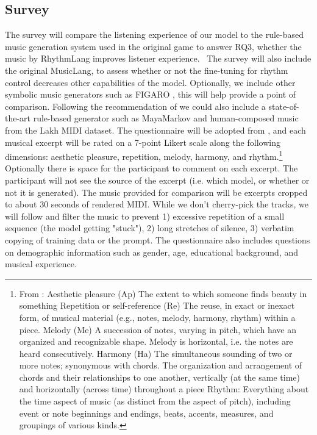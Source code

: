 \subsection{Survey}
The survey will compare the listening experience of our model to the rule-based music generation system used in the original game to answer RQ3, whether the music by RhythmLang improves listener experience.  The survey will also include the original MusicLang, to assess whether or not the fine-tuning for rhythm control decreases other capabilities of the model. Optionally, we include other symbolic music generators such as FIGARO \cite{Rütte_figaro_2023}, this will help provide a point of comparison. Following the recommendation of \cite{Yin_Reuben_Stepney_Collins_2023} we could also include a state-of-the-art rule-based generator such as MayaMarkov \cite{Collins_Laney_2017} and human-composed music from the Lakh MIDI dataset. 
The questionnaire will be adopted from \cite{Yin_Reuben_Stepney_Collins_2023}, and each musical excerpt will be rated on a 7-point Likert scale along the following dimensions: aesthetic pleasure, repetition, melody, harmony, and rhythm.\footnote{From \cite{Yin_Reuben_Stepney_Collins_2023}: Aesthetic pleasure (Ap) The extent to which someone finds beauty in something 
Repetition or self-reference (Re) The reuse, in exact or inexact form, of musical material (e.g., notes, melody, harmony, rhythm) within a piece.
Melody (Me) A succession of notes, varying in pitch, which have an organized and recognizable shape. Melody is horizontal, i.e. the notes are heard consecutively.
Harmony (Ha) The simultaneous sounding of two or more notes; synonymous with chords. The organization and arrangement of chords and their relationships
to one another, vertically (at the same time) and horizontally (across time) throughout a piece
Rhythm: Everything about the time aspect of music (as distinct from the aspect of pitch), including event or note beginnings and endings, beats, accents, measures, and groupings of various kinds.} 
Optionally there is space for the participant to comment on each excerpt. The participant will not see the source of the excerpt (i.e. which model, or whether or not it is generated). 
The music provided for comparison will be excerpts cropped to about 30 seconds of rendered MIDI. While we don't cherry-pick the tracks, we will follow \cite{Yin_Reuben_Stepney_Collins_2023} and filter the music to prevent 1) excessive repetition of a small sequence (the model getting "stuck"), 2) long stretches of silence, 3) verbatim copying of training data or the prompt. 
The questionnaire also includes questions on demographic information such as gender, age, educational background, and musical experience.


